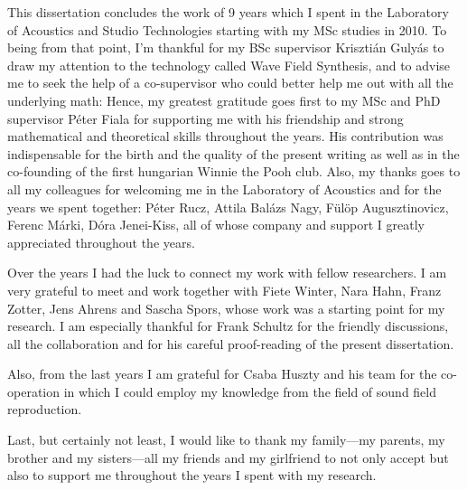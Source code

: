 This dissertation concludes the work of 9 years which I spent in the Laboratory of Acoustics and Studio Technologies starting with my MSc studies in 2010.
To being from that point, I'm thankful for my BSc supervisor Krisztián Gulyás to draw my attention to the technology called Wave Field Synthesis, and to advise me to seek the help of a co-supervisor who could better help me out with all the underlying math:
Hence, my greatest gratitude goes first to my MSc and PhD supervisor Péter Fiala for supporting me with his friendship and strong mathematical and theoretical skills throughout the years.
His contribution was indispensable for the birth and the quality of the present writing as well as in the co-founding of the first hungarian Winnie the Pooh club.
Also, my thanks goes to all my colleagues for welcoming me in the Laboratory of Acoustics and for the years we spent together: Péter Rucz, Attila Balázs Nagy, Fülöp Augusztinovicz, Ferenc Márki, Dóra Jenei-Kiss, all of whose company and support I greatly appreciated throughout the years.

Over the years I had the luck to connect my work with fellow researchers.
I am very grateful to meet and work together with Fiete Winter, Nara Hahn, Franz Zotter, Jens Ahrens and Sascha Spors, whose work was a starting point for my research.
I am especially thankful for Frank Schultz for the friendly discussions, all the collaboration and for his careful proof-reading of the present dissertation.

Also, from the last years I am grateful for Csaba Huszty and his team for the co-operation in which I could employ my knowledge from the field of sound field reproduction.

Last, but certainly not least, I would like to thank my family---my parents, my brother and my sisters---all my friends and my girlfriend to not only accept but also to support me throughout the years I spent with my research.